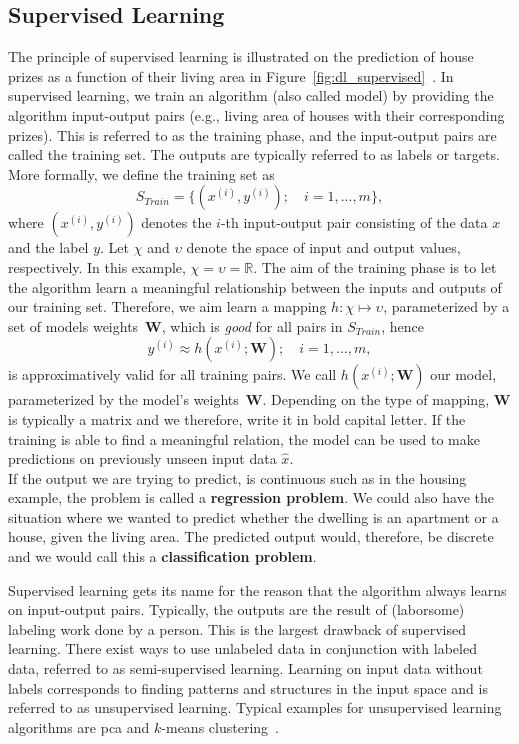 \subsection{Supervised Learning} \label{sec:ml_supervised}
The principle of supervised learning is illustrated on the prediction of house prizes as a function of their living area in Figure~\ref{fig:dl_supervised}~\cite{Ng2012StanfordNotes}. In supervised learning, we train an algorithm (also called model) by providing the algorithm input-output pairs (e.g., living area of houses with their corresponding prizes). This is referred to as the training phase, and the input-output pairs are called the training set. The outputs are typically referred to as labels or targets. More formally, we define the training set as
\begin{equation}
   S_{Train} = \{(x^{(i)}, y^{(i)}); \quad i = 1,...,m\},
   \label{eq:training_set}
\end{equation}
where $(x^{(i)}, y^{(i)})$ denotes the $i$-th input-output pair consisting of the data $x$ and the label $y$. Let $\chi$ and $\upsilon$ denote the space of input and output values, respectively. In this example, $\chi = \upsilon = \mathbb{R}$. The aim of the training phase is to let the algorithm learn a meaningful relationship between the inputs and outputs of our training set. Therefore, we aim learn a mapping $h : \chi \mapsto \upsilon$, parameterized by a set of models weights~$\textbf{W}$, which is \textit{good} for all pairs in $S_{Train}$, hence
\begin{equation}
   y^{(i)} \approx h(x^{(i)}; \mathbf{W}); \quad i = 1,...,m,
   \label{eq:model}
\end{equation}
is approximatively valid for all training pairs. We call $h(x^{(i)}; \mathbf{W})$ our model, parameterized by the model's weights~$\textbf{W}$. Depending on the type of mapping, $\mathbf{W}$ is typically a matrix and we therefore, write it in bold capital letter. If the training is able to find a meaningful relation, the model can be used to make predictions on previously unseen input data $\hat{x}$.\\
If the output we are trying to predict, is continuous such as in the housing example, the problem is called a \textbf{regression problem}. We could also have the situation where we wanted to predict whether the dwelling is an apartment or a house, given the living area. The predicted output would, therefore, be discrete and we would call this a \textbf{classification problem}.

Supervised learning gets its name for the reason that the algorithm always learns on input-output pairs. Typically, the outputs  are the result of (laborsome) labeling work done by a person. This is the largest drawback of supervised learning. There exist ways to use unlabeled data in conjunction with labeled data, referred to as semi-supervised learning. Learning on input data without labels corresponds to finding patterns and structures in the input space and is referred to as unsupervised learning. Typical examples for unsupervised learning algorithms are \gls{pca} and $k$-means clustering~\cite{Goodfellow2016DeepLearning}.

